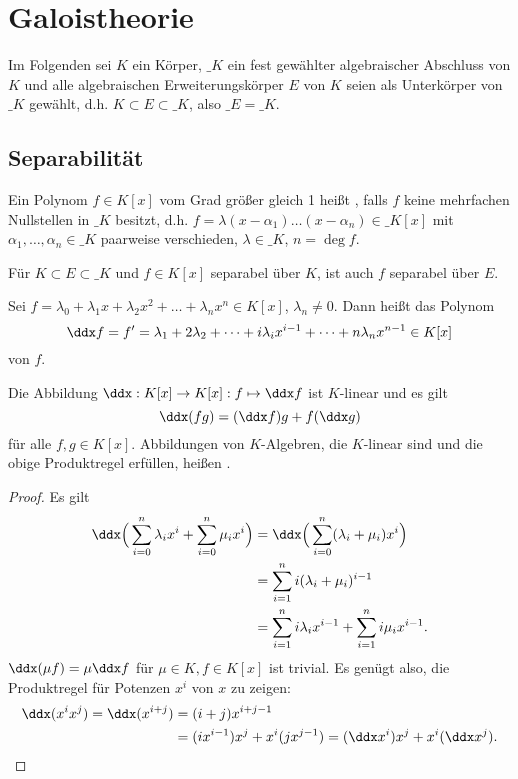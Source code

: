 \chapter{Galoistheorie}


Im Folgenden sei $K$ ein Körper, $\_K$ ein fest gewählter algebraischer Abschluss von $K$ und alle algebraischen Erweiterungskörper $E$ von $K$ seien als Unterkörper von $\_K$ gewählt, d.h. $K \subset E \subset \_K$, also $\_E = \_K$.


\section{Separabilität}


\begin{df} \label{19.1-1}
	Ein Polynom $f \in K[x]$ vom Grad größer gleich 1 heißt , falls $f$ keine mehrfachen Nullstellen in $\_K$ besitzt, d.h. $f = \lambda (x - \alpha_1) \dotsc (x - \alpha_n) \in \_K[x]$ mit $\alpha_1, \dotsc, \alpha_n \in \_K$ paarweise verschieden, $\lambda \in \_K$, $n = \deg f$.
	\begin{note}
		Für $K \subset E \subset \_K$ und $f \in K[x]$ separabel über $K$, ist auch $f$ separabel über $E$.
	\end{note}
\end{df}

\begin{df} \label{19.1-2}
	Sei $f = \lambda_0 + \lambda_1 x + \lambda_2 x^2 + \dotsc + \lambda_n x^n \in K[x]$, $\lambda_n \neq 0$.
	Dann heißt das Polynom
	\[
		\ddx f = f' = \lambda_1 + 2 \lambda_2 + \dotsb + i \lambda_i x^{i-1} + \dotsb + n \lambda_n x^{n-1}
		\in K[x]
	\]
	 von $f$.
\end{df}

\begin{lem}[Produktregel] \label{19.1-3}
	Die Abbildung $\ddx: K[x] \to K[x] : f \mapsto \ddx f$ ist $K$-linear und es gilt
	\[
		\ddx (fg) = (\ddx f) g + f (\ddx g)
	\]
	für alle $f, g \in K[x]$.
	Abbildungen von $K$-Algebren, die $K$-linear sind und die obige Produktregel erfüllen, heißen .
	\begin{proof}
		Es gilt
		\begin{align*}
			\ddx \Big(\sum_{i=0}^n \lambda_i x^i + \sum_{i=0}^{n} \mu_i x^i \Big)
			&= \ddx \Big(\sum_{i=0}^{n} (\lambda_i + \mu_i) x^i \Big) \\
			&= \sum_{i=1}^{n} i(\lambda_i + \mu_i)^{i-1} \\
			&= \sum_{i=1}^{n} i \lambda_i x^{i-1} + \sum_{i=1}^{n} i \mu_i x^{i-1}.
		\end{align*}
		$\ddx (\mu f) = \mu \ddx f$ für $\mu \in K, f \in K[x]$ ist trivial.
		Es genügt also, die Produktregel für Potenzen $x^i$ von $x$ zu zeigen:
		\begin{align*}
			\ddx(x^i x^j)
			= \ddx(x^{i+j})
			&= (i+j)x^{i+j-1} \\
			&= (i x^{i-1}) x^j + x^i (j x^{j-1})
			= (\ddx x^i) x^j + x^i (\ddx x^j).
		\end{align*}
	\end{proof}
\end{lem}

